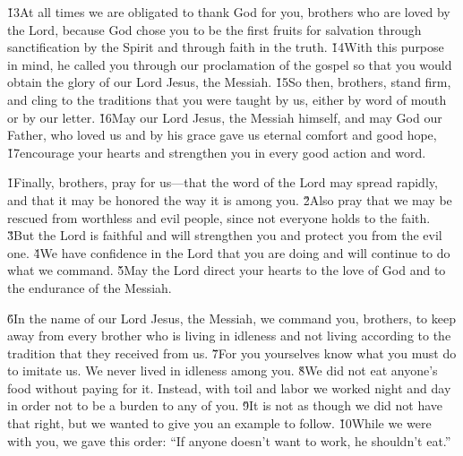 \v{13}At all times we are obligated to thank God for you, brothers who are loved by the Lord, because God chose you to be the first fruits for salvation through sanctification by the Spirit and through faith in the truth. \v{14}With this purpose in mind, he called you through our proclamation of the gospel so that you would obtain the glory of our Lord Jesus, the Messiah. \v{15}So then, brothers, stand firm, and cling to the traditions that you were taught by us, either by word of mouth or by our letter. \v{16}May our Lord Jesus, the Messiah himself, and may God our Father, who loved us and by his grace gave us eternal comfort and good hope, \v{17}encourage your hearts and strengthen you in every good action and word.

\v{1}Finally, brothers, pray for us---that the word of the Lord may spread rapidly, and that it may be honored the way it is among you. \v{2}Also pray that we may be rescued from worthless and evil people, since not everyone holds to the faith. \v{3}But the Lord is faithful and will strengthen you and protect you from the evil one. \v{4}We have confidence in the Lord that you are doing and will continue to do what we command. \v{5}May the Lord direct your hearts to the love of God and to the endurance of the Messiah.

\v{6}In the name of our Lord Jesus, the Messiah, we command you, brothers, to keep away from every brother who is living in idleness and not living according to the tradition that they received from us. \v{7}For you yourselves know what you must do to imitate us. We never lived in idleness among you. \v{8}We did not eat anyone's food without paying for it. Instead, with toil and labor we worked night and day in order not to be a burden to any of you. \v{9}It is not as though we did not have that right, but we wanted to give you an example to follow. \v{10}While we were with you, we gave this order: ``If anyone doesn't want to work, he shouldn't eat.''

